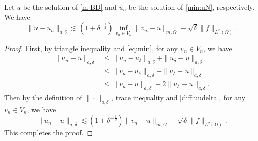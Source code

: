 \begin{theorem}\label{thm:bestD}
  Let $u$ be the solution of \eqref{m-BD} and
  $u_n$ be the solution of \eqref{min:uN}, respectively. We have
  \begin{equation}
  \label{eq:13}
\|u-u_n\|_{a,\delta} \lesssim (1+ \delta^{-\frac12})  \inf_{v_n\in
  V_n} \|v_n-u\|_{m,\Omega}
+\sqrt{\delta}  \|f\|_{L^2(\Omega)}. 
  \end{equation}
\end{theorem}
\begin{proof}
First, by triangle inequality and \eqref{eq:min}, for any $v_n\in V_n$, we have
\begin{align}
\|u_n-u\|_{a,\delta}&\le  \|u_n-u_\delta\|_{a,\delta}+\|u_\delta-u\|_{a,\delta}\\
&\le \|v_n-u_\delta\|_{a,\delta}+\|u_\delta-u\|_{a,\delta}\\
&\le  \|v_n-u\|_{a,\delta}+2\|u_\delta-u\|_{a,\delta} .
\end{align}
Then by the definition of $\|\cdot\|_{a,\delta}$, trace inequality and \eqref{diff:uudelta}, for any $v_n\in V_n$, we have 
 \begin{equation}
\|u_n-u\|_{a,\delta} \lesssim (1+ \delta^{-\frac12}) \|v_n-u\|_{m,\Omega}
+\sqrt{\delta}  \|f\|_{L^2(\Omega)}. 
\end{equation}
This completes the proof. 
\end{proof}

